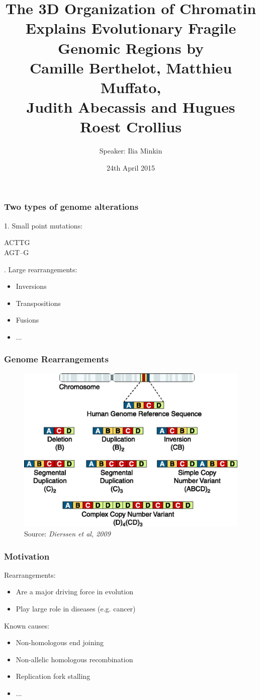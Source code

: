 \documentclass[svgnames,14pt]{beamer}
\title{The 3D Organization of Chromatin Explains Evolutionary Fragile Genomic Regions by \\ \vspace{12pt} \normalsize{Camille Berthelot, Matthieu Muffato, \\ Judith Abecassis and Hugues Roest Crollius} }
\author{Speaker: Ilia Minkin}
\institute{}
\begin{document}
\date{24th April 2015}
\maketitle

\begin{frame}
\frametitle{Two types of genome alterations}

1. Small point mutations:

{\vspace{12pt} \Large \color{Blue}
ACTTG\\
A{\color{Red}G}T--\hspace{2.7pt}G
\vspace{12pt}}

. Large rearrangements:
\begin{itemize}
\item Inversions
\item Transpositions
\item Fusions
\item ...
\end{itemize}
\end{frame}

\begin{frame}
\frametitle{Genome Rearrangements}
\begin{figure}
	\centering
	\includegraphics[scale = 0.20]{BasicRearr.jpg}
\caption{Source: \textit{Dierssen et al, 2009}}
\end{figure}
\end{frame}

\begin{frame}
\frametitle{Motivation}
Rearrangements:
\begin{itemize}
\item Are a major driving force in evolution
\item Play large role in diseases (e.g. cancer)
\end{itemize}
Known causes:
\begin{itemize}
\item Non-homologous end joining
\item Non-allelic homologous recombination
\item Replication fork stalling
\item ...
\end{itemize}
\end{frame}
\end{document}
